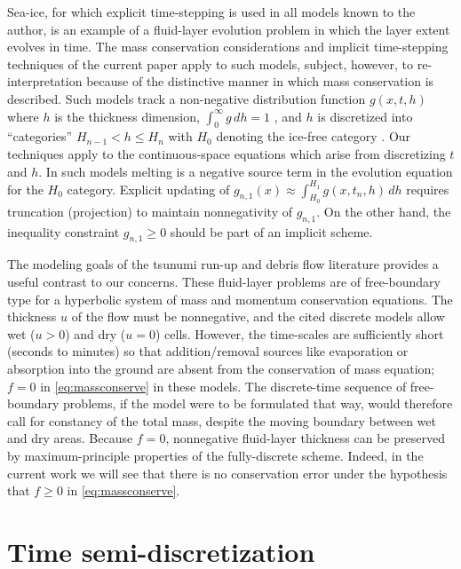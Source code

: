 \documentclass[final,leqno,onefignum,onetabnum]{siamltex1213bueler}
\begin{document}
Sea-ice, for which explicit time-stepping is used in all models known to the author, is an example of a fluid-layer evolution problem in which the layer extent evolves in time.  The mass conservation considerations and implicit time-stepping techniques of the current paper apply to such models, subject, however, to re-interpretation because of the distinctive manner in which mass conservation is described.  Such models track a non-negative distribution function $g(x,t,h)$ where $h$ is the thickness dimension, $\int_0^\infty g\,dh = 1$ \cite{Thorndikeetal1975}, and $h$ is discretized into ``categories'' $H_{n-1} < h \le H_n$ with $H_0$ denoting the ice-free category \cite{LipscombHunke2004}.  Our techniques apply to the continuous-space equations which arise from discretizing $t$ and $h$.  In such models melting is a negative source term in the evolution equation for the $H_0$ category.  Explicit updating of $g_{n,1}(x) \approx \int_{H_0}^{H_1} g(x,t_n,h)\,dh$ requires truncation (projection) to maintain nonnegativity of $g_{n,1}$.  On the other hand, the inequality constraint $g_{n,1} \ge 0$ should be part of an implicit scheme.

The modeling goals of the tsunumi run-up \cite{LeVequeetal2011} and debris flow \cite{GeorgeIverson2014} literature provides a useful contrast to our concerns.  These fluid-layer problems are of free-boundary type for a hyperbolic system of mass and momentum conservation equations.  The thickness $u$ of the flow must be nonnegative, and the cited discrete models allow wet ($u>0$) and dry ($u=0$) cells.  However, the time-scales are sufficiently short (seconds to minutes) so that addition/removal sources like evaporation or absorption into the ground are absent from the conservation of mass equation; $f=0$ in \eqref{eq:massconserve} in these models.  The discrete-time sequence of free-boundary problems, if the model were to be formulated that way, would therefore call for constancy of the total mass, despite the moving boundary between wet and dry areas.  Because $f=0$, nonnegative fluid-layer thickness can be preserved by maximum-principle properties of the fully-discrete scheme.  Indeed, in the current work we will see that there is no conservation error under the hypothesis that $f\ge 0$ in \eqref{eq:massconserve}.


\section{Time semi-discretization}  \label{sec:strongform}
\end{document}
